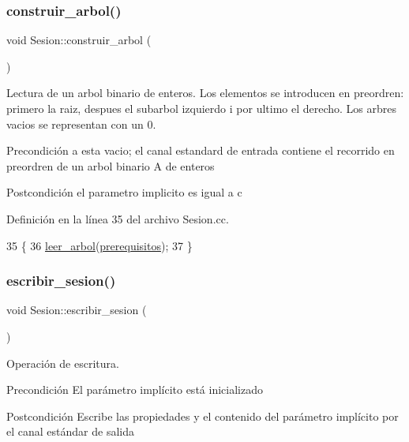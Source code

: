 \subsubsection{\texorpdfstring{construir\+\_\+arbol()}{construir\_arbol()}}
{\footnotesize\ttfamily void Sesion\+::construir\+\_\+arbol (\begin{DoxyParamCaption}{ }\end{DoxyParamCaption})}



Lectura de un arbol binario de enteros. Los elementos se introducen en preordren\+: primero la raiz, despues el subarbol izquierdo i por ultimo el derecho. Los arbres vacios se representan con un 0. 

\begin{DoxyPrecond}{Precondición}
a esta vacio; el canal estandard de entrada contiene el recorrido en preordren de un arbol binario A de enteros 
\end{DoxyPrecond}
\begin{DoxyPostcond}{Postcondición}
el parametro implicito es igual a c 
\end{DoxyPostcond}


Definición en la línea 35 del archivo Sesion.\+cc.


\begin{DoxyCode}
35                              \{
36     \mbox{\hyperlink{class_sesion_adea0f5f335e3eab364dfc59c28d790f3}{leer\_arbol}}(\mbox{\hyperlink{class_sesion_abdfe53bdef12bfa9ab510cad99b0de27}{prerequisitos}});
37 \}
\end{DoxyCode}
\mbox{\label{class_sesion_a0243a367d0e9787328c3a956bd8846ef}} 
\subsubsection{\texorpdfstring{escribir\+\_\+sesion()}{escribir\_sesion()}}
{\footnotesize\ttfamily void Sesion\+::escribir\+\_\+sesion (\begin{DoxyParamCaption}{ }\end{DoxyParamCaption})}



Operación de escritura. 

\begin{DoxyPrecond}{Precondición}
El parámetro implícito está inicializado 
\end{DoxyPrecond}
\begin{DoxyPostcond}{Postcondición}
Escribe las propiedades y el contenido del parámetro implícito por el canal estándar de salida 
\end{DoxyPostcond}


